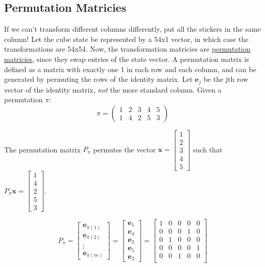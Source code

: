 \documentclass[11pt, oneside]{article}
\newcommand{\ve}[1]{\mathbf{#1}}
\begin{document}
\subsection{Permutation Matricies}
If we can't transform different columns differently, put all the stickers in the same column!
Let the cube state be represented by a 54x1 vector, in which case the transformations are 54x54.
Now, the transformation matricies are \href{https://en.wikipedia.org/wiki/Permutation_matrix}{permutation matricies},
since they swap entries of the state vector. A permutation matrix is defined as a matrix with exactly one 1 in each row and each column, and can be generated
by permuting the rows of the identity matrix. Let \( \ve{e}_j \) be the jth
row vector of the identity matrix, \textit{not} the more standard column.
Given a permutation \( \pi \):
\[ \pi = \begin{pmatrix}
         1 & 2 & 3 & 4 & 5 \\
         1 & 4 & 2 & 5 & 3
        \end{pmatrix}
\]

The permutation matrix \( P_{\pi} \) permutes the vector \( \ve{x} = \begin{bmatrix} 1 \\ 2 \\ 3 \\ 4 \\ 5 \end{bmatrix} \) such that \( P_{\pi}\ve{x} =
\begin{bmatrix} 1 \\ 4 \\ 2 \\ 5 \\ 3 \end{bmatrix} \).

\[ P_{\pi} = \begin{bmatrix} \ve{e}_{\pi(1)} \\ \ve{e}_{\pi(2)} \\ \vdots \\ \ve{e}_{\pi(m)} \end{bmatrix} =
\begin{bmatrix} \ve{e}_{1} \\ \ve{e}_{4} \\ \ve{e}_{2} \\ \ve{e}_{5}  \\ \ve{e}_{3} \end{bmatrix} =
\begin{bmatrix}
1 & 0 & 0 & 0 & 0 \\
0 & 0 & 0 & 1 & 0 \\
0 & 1 & 0 & 0 & 0 \\
0 & 0 & 0 & 0 & 1 \\
0 & 0 & 1 & 0 & 0 \\
\end{bmatrix} \]
\end{document}
